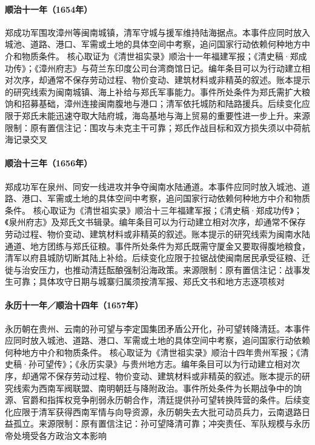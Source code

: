 \hypertarget{civic:EQ-1654-ZHENG-ZHANGZHOU}{}\paragraph{顺治十一年（1654年）}郑成功军围攻漳州等闽南城镇，清军守城与援军维持陆海据点。本事件应同时放入城池、道路、港口、军需或土地的具体空间中考察，追问国家行动依赖何种地方中介和物质条件。 核心取证为《清世祖实录》顺治十一年福建军报；《清史稿·郑成功传》；《漳州府志》与荷兰东印度公司台湾商馆日记。编年条目可以为行动建立相对次序，却通常不保存劳动过程、物价变动、建筑材料或非精英的叙述。账本提示的研究线索为闽南城镇、海上补给与郑氏军事能力。事件所处条件为郑氏需扩大粮饷和招募基础，漳州连接闽南腹地与港口；清军依托城防和陆路援兵。后续变化应限于郑氏未能迅速夺取大陆府城，海岛基地与海上贸易的重要性进一步上升。来源限制：原有置信注记：围攻与未克主干可靠；郑氏作战目标和双方损失须以中荷航海记录交叉
\hypertarget{civic:EQ-1656-ZHENG-QUANZHOU}{}\paragraph{顺治十三年（1656年）}郑成功军在泉州、同安一线进攻并争夺闽南水陆通道。本事件应同时放入城池、道路、港口、军需或土地的具体空间中考察，追问国家行动依赖何种地方中介和物质条件。 核心取证为《清世祖实录》顺治十三年福建军报；《清史稿·郑成功传》；《泉州府志》及郑氏文书辑录。编年条目可以为行动建立相对次序，却通常不保存劳动过程、物价变动、建筑材料或非精英的叙述。账本提示的研究线索为闽南水陆通道、地方团练与郑氏征粮。事件所处条件为郑氏既需守厦金又要取得腹地粮食，清军以府县城防切断其陆上补给。后续变化应限于拉锯战使闽南居民承受征粮、迁徙与治安压力，也推动清廷酝酿强制沿海政策。来源限制：原有置信注记：战事发生可靠；具体攻守日期与城寨归属须按清军报、郑氏文书和地方志逐项核对
\hypertarget{civic:EQ-1657-YONGLI-GUIZHOU}{}\paragraph{永历十一年／顺治十四年（1657年）}永历朝在贵州、云南的孙可望与李定国集团矛盾公开化，孙可望转降清廷。本事件应同时放入城池、道路、港口、军需或土地的具体空间中考察，追问国家行动依赖何种地方中介和物质条件。 核心取证为《清世祖实录》顺治十四年贵州军报；《清史稿·孙可望传》；《永历实录》与贵州地方志。编年条目可以为行动建立相对次序，却通常不保存劳动过程、物价变动、建筑材料或非精英的叙述。账本提示的研究线索为西南军阀联盟、南明朝廷与降附政治。事件所处条件为长期战争中的饷源、官爵和指挥权竞争削弱永历朝合作，清廷提供孙可望转换阵营的条件。后续变化应限于清军获得西南军情与向导资源，永历朝失去大批可动员兵力，云南退路日益孤立。来源限制：原有置信注记：孙可望降清可靠；冲突责任、军队规模与永历帝处境受各方政治文本影响
